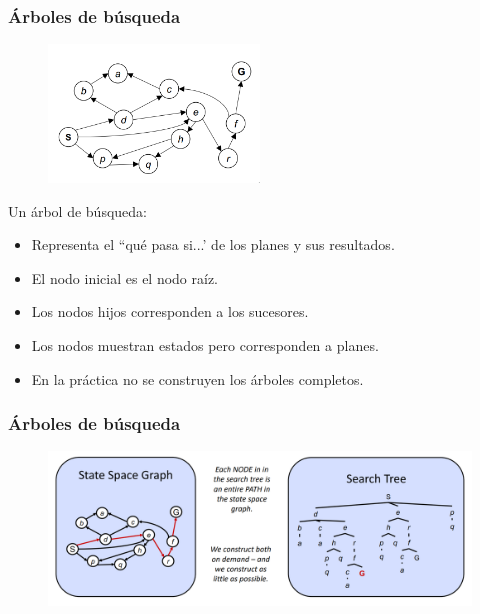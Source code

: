 \documentclass[10pt]{beamer}
\begin{document}
\begin{frame}
  \frametitle{Árboles de búsqueda}
  \begin{figure}[!h] 
    \centering
    \includegraphics[width=0.5\textwidth]{img/grafo3}
  \end{figure}
  
  Un árbol de búsqueda:
  \begin{itemize}
    \item Representa el ``qué pasa si...' de los planes y sus resultados.
    \item El nodo inicial es el nodo raíz.
    \item Los nodos hijos corresponden a los sucesores.
    \item Los nodos muestran estados pero corresponden a \alert{planes}.
    \item En la práctica no se construyen los árboles completos.
  \end{itemize}

\end{frame}

\begin{frame}
  \frametitle{Árboles de búsqueda}
  \begin{figure}[!h] 
    \centering
    \includegraphics[width=1\textwidth]{img/spacetree}
  \end{figure}
\end{frame}
\end{document}
